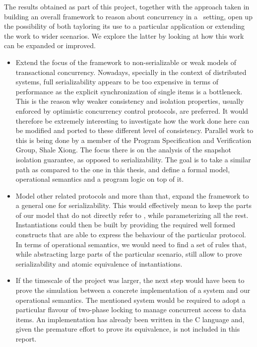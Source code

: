 The results obtained as part of this project, together with the approach taken in building an overall framework to reason about concurrency in a \tpl\ setting, open up the possibility of both tayloring its use to a particular application or extending the work to wider scenarios. We explore the latter by looking at how this work can be expanded or improved.
\begin{itemize}
	\item Extend the focus of the framework to non-serializable or weak models of transactional concurrency. Nowadays, specially in the context of distributed systems, full serializability appears to be too expensive in terms of performance as the explicit synchronization of single items is a bottleneck. This is the reason why weaker consistency and isolation properties, usually enforced by optimistic concurrency control protocols, are preferred. It would therefore be extremely interesting to investigate how the work done here can be modified and ported to these different level of consistency.  Parallel work to this is being done by a member of the Program Specification and Verification Group, Shale Xiong. The focus there is on the analysis of the snapshot isolation guarantee, as opposed to serializability. The goal is to take a similar path as compared to the one in this thesis, and define a formal model, operational semantics and a program logic on top of it.
	
	\item Model other related protocols and more than that, expand the framework to a general one for serializability. This would effectively mean to keep the parts of our model that do not directly refer to \tpl, while parameterizing all the rest. Instantiations could then be built by providing the required well formed constructs that are able to express the behaviour of the particular protocol. In terms of operational semantics, we would need to find a set of rules that, while abstracting large parts of the particular scenario, still allow to prove serializability and atomic equivalence of instantiations.
	
	\item If the timescale of the project was larger, the next step would have been to prove the simulation between a concrete implementation of a system and our operational semantics. The mentioned system would be required to adopt a particular flavour of two-phase locking to manage concurrent access to data items. An implementation has already been written in the C language and, given the premature effort to prove its equivalence, is not included in this report.
	

\end{itemize}

